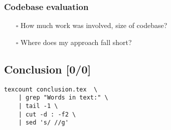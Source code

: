 \documentclass[11pt]{article}
\begin{document}
\subsubsection{{\bfseries\sffamily [ ]} Codebase evaluation}
\label{sec:org4440cf5}
\begin{itemize}
\item[{$\square$}] How much work was involved, size of codebase?
\item[{$\square$}] Where does my approach fall short?
\end{itemize}

\subsection{{\bfseries\sffamily [ ]} Conclusion [0/0]}
\label{sec:orgeab2434}
\begin{verbatim}
texcount conclusion.tex  \
    | grep "Words in text:" \
    | tail -1 \
    | cut -d : -f2 \
    | sed 's/ //g'
\end{verbatim}
\end{document}
